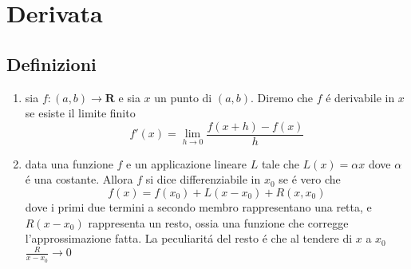 \documentclass{exam}
\begin{document}
\section{Derivata}
  \subsection{Definizioni}
    \begin{enumerate}
      \item
        sia $f:(a,b)\rightarrow \mathbf{R}$ e sia $x$ un punto di $(a,b)$. Diremo che $f$ \'e derivabile in $x$ se esiste il limite finito
        \begin{equation}
          f'(x)=\lim_{h\to 0}\frac{f(x+h)-f(x)}{h} 
        \end{equation}
      \item
      	data una funzione $f$ e un applicazione lineare $L$ tale che $L(x)=\alpha x$ dove $\alpha$ \'e una costante. Allora $f$ si dice differenziabile in $x_0$ se \'e vero che 
      	\begin{equation}
      		f(x)=f(x_0)+L(x-x_0)+R(x,x_0)
      	\end{equation}
      	dove i primi due termini a secondo membro rappresentano una retta, e $R(x-x_0)$ rappresenta un resto, ossia una funzione che corregge l'approssimazione fatta.
      	La peculiarit\'a del resto \'e che al tendere di $x$ a $x_0$ $\frac{R}{x-x_0}\rightarrow 0$
    \end{enumerate}
\end{document}
